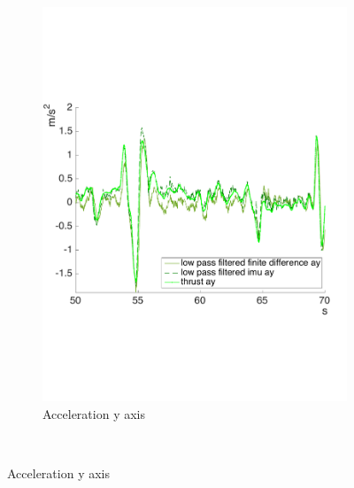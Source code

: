 \begin{figure}[!htbp]
\begin{subfigure}[b]{0.45\textwidth}
     \includegraphics[width=\textwidth]{img/acc_y.pdf}
        \caption{Acceleration y axis}
        \label{fig:comparison_accy_fil}
   \end{subfigure}\\
   

\end{figure}
